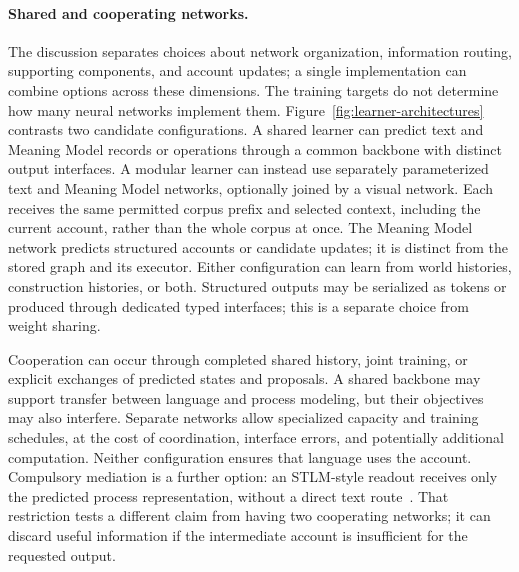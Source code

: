 \documentclass[10pt]{article}
\begin{document}
\paragraph{Shared and cooperating networks.}
The discussion separates choices about network organization, information
routing, supporting components, and account updates; a single implementation
can combine options across these dimensions.
The training targets do not determine how many neural networks implement them.
Figure~\ref{fig:learner-architectures} contrasts two candidate configurations.
A shared learner can predict text and Meaning Model records or operations
through a common backbone with distinct output interfaces. A modular learner
can instead use separately parameterized text and Meaning Model networks,
optionally joined by a visual network. Each receives the same permitted corpus
prefix and selected context, including the current account, rather than the
whole corpus at once. The Meaning Model network predicts structured accounts
or candidate updates; it is distinct from the stored graph and its executor.
Either configuration can learn from world histories, construction histories,
or both. Structured outputs may be serialized as tokens or produced through
dedicated typed interfaces; this is a separate choice from weight sharing.

Cooperation can occur through completed shared history, joint training, or
explicit exchanges of predicted states and proposals. A shared backbone may
support transfer between language and process modeling, but their objectives
may also interfere. Separate networks allow specialized capacity and training
schedules, at the cost of coordination, interface errors, and potentially
additional computation. Neither configuration ensures that language uses the
account. Compulsory mediation is a further option: an STLM-style readout
receives only the predicted process representation, without a direct text
route~\cite{westerbergSTLM2026}. That restriction tests a different claim from
having two cooperating networks; it can discard useful information if the
intermediate account is insufficient for the requested output.
\end{document}

